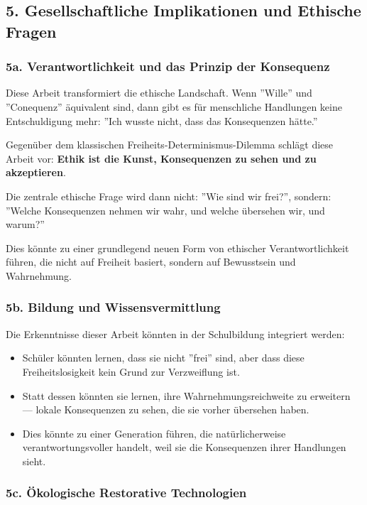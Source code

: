 \documentclass[a4paper,12pt]{article}
\theoremstyle{definition}
\begin{document}
\subsection{5. Gesellschaftliche Implikationen und Ethische Fragen}

\subsubsection{5a. Verantwortlichkeit und das Prinzip der Konsequenz}

Diese Arbeit transformiert die ethische Landschaft. Wenn ''Wille'' und ''Conequenz'' äquivalent sind, dann gibt es für menschliche Handlungen keine Entschuldigung mehr: ''Ich wusste nicht, dass das Konsequenzen hätte.'' 

Gegenüber dem klassischen Freiheits-Determinismus-Dilemma schlägt diese Arbeit vor: \textbf{Ethik ist die Kunst, Konsequenzen zu sehen und zu akzeptieren}.

Die zentrale ethische Frage wird dann nicht: ''Wie sind wir frei?'', sondern: ''Welche Konsequenzen nehmen wir wahr, und welche übersehen wir, und warum?''

Dies könnte zu einer grundlegend neuen Form von ethischer Verantwortlichkeit führen, die nicht auf Freiheit basiert, sondern auf Bewusstsein und Wahrnehmung.

\subsubsection{5b. Bildung und Wissensvermittlung}

Die Erkenntnisse dieser Arbeit könnten in der Schulbildung integriert werden:
\begin{itemize}
    \item Schüler könnten lernen, dass sie nicht ''frei'' sind, aber dass diese Freiheitslosigkeit kein Grund zur Verzweiflung ist.
    
    \item Statt dessen könnten sie lernen, ihre Wahrnehmungsreichweite zu erweitern --- lokale Konsequenzen zu sehen, die sie vorher übersehen haben.
    
    \item Dies könnte zu einer Generation führen, die natürlicherweise verantwortungsvoller handelt, weil sie die Konsequenzen ihrer Handlungen sieht.
\end{itemize}

\subsubsection{5c. Ökologische Restorative Technologien}
\end{document}
